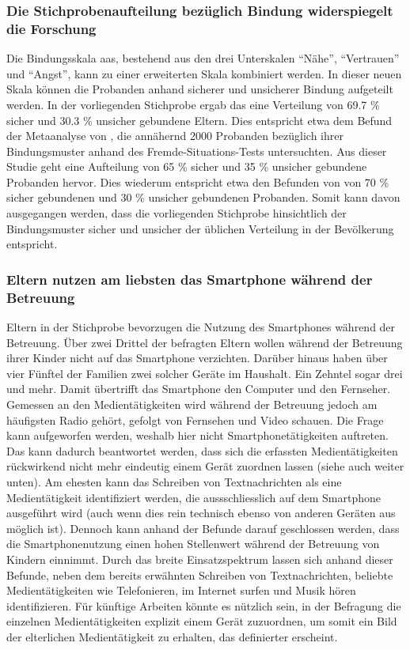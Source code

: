 \subsubsection{Die Stichprobenaufteilung bezüglich Bindung widerspiegelt die Forschung}
Die Bindungsskala \acrfull{aas}, bestehend aus den drei Unterskalen \enquote{Nähe}, \enquote{Vertrauen} und \enquote{Angst}, kann zu einer erweiterten Skala kombiniert werden. In dieser neuen Skala können die Probanden anhand sicherer und unsicherer Bindung aufgeteilt werden. In der vorliegenden Stichprobe ergab das eine Verteilung von 
69.7 \% sicher und 30.3 \% unsicher gebundene Eltern. Dies entspricht etwa dem Befund der Metaanalyse von , die annähernd 2000  Probanden bezüglich ihrer Bindungsmuster anhand des Fremde-Situations-Tests untersuchten. Aus dieser Studie geht eine Aufteilung von 65 \% sicher und 35 \% unsicher gebundene Probanden hervor. Dies wiederum entspricht etwa den Befunden von  von 70 \% sicher gebundenen und 30 \% unsicher gebundenen Probanden. Somit kann davon ausgegangen werden, dass die vorliegenden Stichprobe hinsichtlich der Bindungsmuster sicher und unsicher der üblichen Verteilung in der Bevölkerung entspricht.

\subsubsection{Eltern nutzen am liebsten das Smartphone während der Betreuung}
Eltern in der Stichprobe bevorzugen die Nutzung des Smartphones während der Betreuung. Über zwei Drittel der befragten Eltern wollen während der Betreuung ihrer Kinder nicht auf das Smartphone verzichten. Darüber hinaus haben über vier Fünftel der Familien zwei solcher Geräte im Haushalt. Ein Zehntel sogar drei und mehr. Damit übertrifft das Smartphone den Computer und den Fernseher. Gemessen an den Medientätigkeiten wird während der Betreuung jedoch am häufigsten Radio gehört, gefolgt von Fernsehen und Video schauen. Die Frage kann aufgeworfen werden, weshalb hier nicht Smartphonetätigkeiten auftreten. Das kann dadurch beantwortet werden, dass sich die erfassten Medientätigkeiten rückwirkend nicht mehr eindeutig einem Gerät zuordnen lassen (siehe auch \textit{} weiter unten). Am ehesten kann das Schreiben von Textnachrichten als eine Medientätigkeit identifiziert werden, die aussschliesslich auf dem Smartphone ausgeführt wird (auch wenn dies rein technisch ebenso von anderen Geräten aus möglich ist). Dennoch kann anhand der Befunde darauf geschlossen werden, dass die Smartphonenutzung einen hohen Stellenwert während der Betreuung von Kindern einnimmt. Durch das breite Einsatz\-spektrum lassen sich anhand dieser Befunde, neben dem bereits erwähnten Schreiben von Textnachrichten, beliebte Medientätigkeiten wie Telefonieren, im Internet surfen und Musik hören identifizieren. Für künftige Arbeiten könnte es nützlich sein, in der Befragung die einzelnen Medientätigkeiten explizit einem Gerät zuzuordnen, um somit ein Bild der elterlichen Medientätigkeit zu erhalten, das definierter erscheint.  


